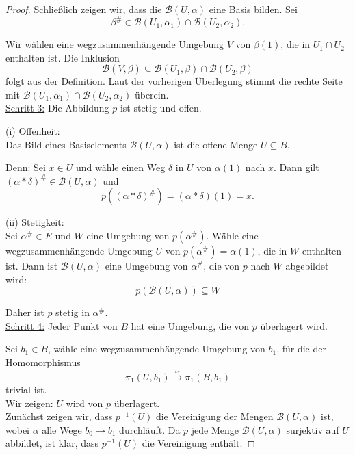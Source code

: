 \documentclass[fleqn, 12pt, letterpaper]{article}
\begin{document}
\begin{proof}
Schließlich zeigen wir, dass die \(\mathcal{B}(U, \alpha)\) eine Basis bilden. Sei  
\[
\beta^{\#} \in \mathcal{B}(U_1, \alpha_1) \cap \mathcal{B}(U_2, \alpha_2).
\]  

Wir wählen eine wegzusammenhängende Umgebung \(V\) von \(\beta(1)\), die in \(U_1 \cap U_2\) enthalten ist.  
Die Inklusion  
\[
\mathcal{B}(V, \beta) \subseteq \mathcal{B}(U_1, \beta) \cap \mathcal{B}(U_2, \beta)
\]  
folgt aus der Definition. Laut der vorherigen Überlegung stimmt die rechte Seite mit  
\(\mathcal{B}(U_1, \alpha_1) \cap \mathcal{B}(U_2, \alpha_2)\) überein.\\


\underline{Schritt 3:} Die Abbildung \( p \) ist stetig und offen.

(i) Offenheit:\\  
Das Bild eines Basiselements \(\mathcal{B}(U, \alpha)\) ist die offene Menge \(U \subseteq B\).  

Denn: Sei \(x \in U\) und wähle einen Weg \(\delta\) in \(U\) von \(\alpha(1)\) nach \(x\).  
Dann gilt \((\alpha * \delta)^{\#} \in \mathcal{B}(U, \alpha)\) und  
\[
p((\alpha * \delta)^{\#}) = (\alpha * \delta)(1) = x.
\]

(ii) Stetigkeit:\\ 
Sei \(\alpha^{\#} \in E\) und \(W\) eine Umgebung von \(p(\alpha^{\#})\). Wähle eine wegzusammenhängende Umgebung \(U\) von \(p(\alpha^{\#}) = \alpha(1)\), die in \(W\) enthalten ist. Dann ist \(\mathcal{B}(U, \alpha)\) eine Umgebung von \(\alpha^{\#}\), die von \(p\) nach \(W\) abgebildet wird:
\[p(\mathcal{B}(U,\alpha))\subseteq W\]

Daher ist \(p\) stetig in \(\alpha^{\#}\).\\

\underline{Schritt 4:} Jeder Punkt von \( B \) hat eine Umgebung, die von \( p \) überlagert wird.

Sei \(b_1 \in B\), wähle eine wegzusammenhängende Umgebung von \(b_1\), für die der Homomorphismus  
\[
\pi_1(U, b_1) \xrightarrow{\iota_*} \pi_1(B, b_1)
\]
trivial ist. \\

Wir zeigen: \(U\) wird von \(p\) überlagert.  \\

Zunächst zeigen wir, dass \(p^{-1}(U)\) die Vereinigung der Mengen \(\mathcal{B}(U, \alpha)\) ist, wobei \(\alpha\) alle Wege \(b_0 \to b_1\) durchläuft. Da \(p\) jede Menge \(\mathcal{B}(U, \alpha)\) surjektiv auf \(U\) abbildet, ist klar, dass \(p^{-1}(U)\) die Vereinigung enthält.  


\end{proof}
\end{document}
